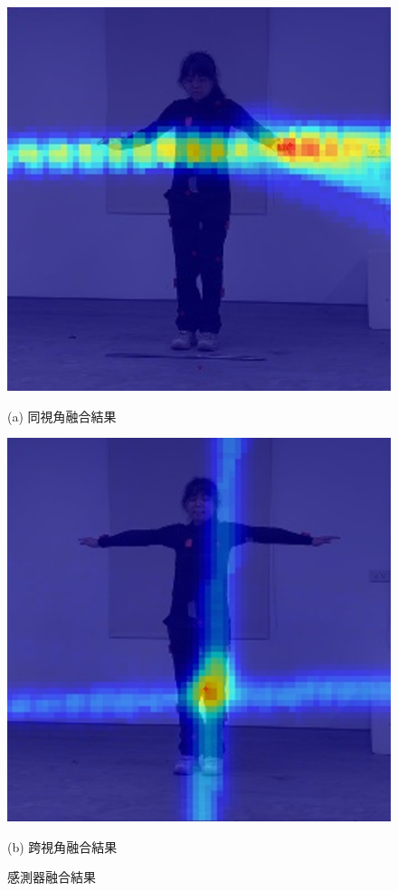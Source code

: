 \begin{figure}[!ht]
   \centering
   \begin{minipage}{.45\textwidth}
      \centering
      \includegraphics[width=.95\linewidth]{figure/ch3_fig_same_view.png}
      \caption*{(a) 同視角融合結果}
   \end{minipage}%
   \vspace{5mm}%
   \begin{minipage}{.45\textwidth}
      \centering
      \includegraphics[width=.95\linewidth]{figure/ch3_fig_cross_view.png}
      \caption*{(b) 跨視角融合結果}
   \end{minipage}
   \captionsetup{justification=centering}
   \caption[感測器融合結果]{感測器融合結果}
   \label{ch3_fig_fusion_result}
\end{figure}

